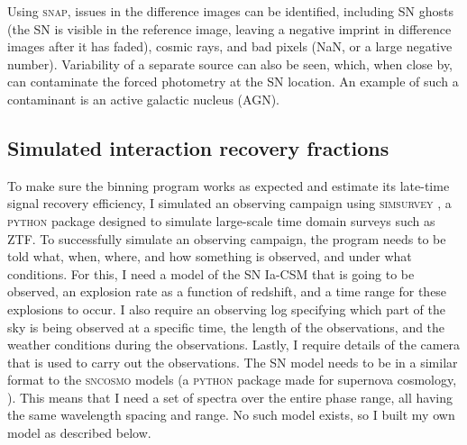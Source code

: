 \documentclass[a4paper,oneside,12pt, class=Latex/Classes/PhDthesisPSnPDF, crop=false]{standalone}
\begin{document}
Using \textsc{snap}, issues in the difference images can be identified, including SN ghosts (the SN is visible in the reference image, leaving a negative imprint in difference images after it has faded), cosmic rays, and bad pixels (NaN, or a large negative number). Variability of a separate source can also be seen, which, when close by, can contaminate the forced photometry at the SN location. An example of such a contaminant is an active galactic nucleus (AGN).


\subsection{Simulated interaction recovery fractions}
\label{simulation}
To make sure the binning program works as expected and estimate its late-time signal recovery efficiency, I simulated an observing campaign using \textsc{simsurvey} \citep{simsurvey, simsurvey_main}, a \textsc{python} package designed to simulate large-scale time domain surveys such as ZTF. To successfully simulate an observing campaign, the program needs to be told what, when, where, and how something is observed, and under what conditions. For this, I need a model of the SN Ia-CSM that is going to be observed, an explosion rate as a function of redshift, and a time range for these explosions to occur. I also require an observing log specifying which part of the sky is being observed at a specific time, the length of the observations, and the weather conditions during the observations. Lastly, I require details of the camera that is used to carry out the observations. The SN model needs to be in a similar format to the \textsc{sncosmo} models (a \textsc{python} package made for supernova cosmology, \citealt{sncosmo}). This means that I need a set of spectra over the entire phase range, all having the same wavelength spacing and range. No such model exists, so I built my own model as described below.
\end{document}
